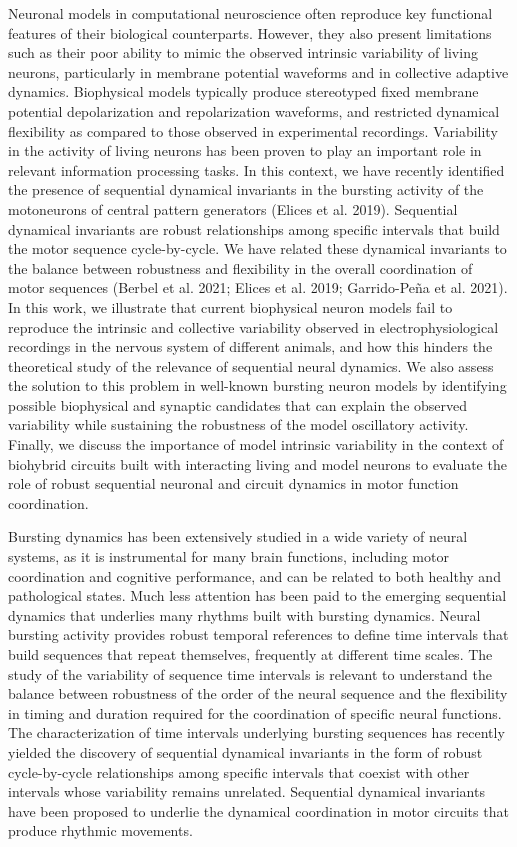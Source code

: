 Neuronal models in computational neuroscience often reproduce key functional features of their biological counterparts. However, they also present limitations such as their poor ability to mimic the observed intrinsic variability of living neurons, particularly in membrane potential waveforms and in collective adaptive dynamics. Biophysical models typically produce stereotyped fixed membrane potential depolarization and repolarization waveforms, and restricted dynamical flexibility as compared to those observed in experimental recordings. Variability in the activity of living neurons has been proven to play an important role in relevant information processing tasks. In this context, we have recently identified the presence of sequential dynamical invariants in the bursting activity of the motoneurons of central pattern generators (Elices et al. 2019). Sequential dynamical invariants are robust relationships among specific intervals that build the motor sequence cycle-by-cycle. We have related these dynamical invariants to the balance between robustness and flexibility in the overall coordination of motor sequences (Berbel et al. 2021; Elices et al. 2019; Garrido-Peña et al. 2021). In this work, we illustrate that current biophysical neuron models fail to reproduce the intrinsic and collective variability observed in electrophysiological recordings in the nervous system of different animals, and how this hinders the theoretical study of the relevance of sequential neural dynamics. We also assess the solution to this problem in well-known bursting neuron models by identifying possible biophysical and synaptic candidates that can explain the observed variability while sustaining the robustness of the model oscillatory activity. Finally, we discuss the importance of model intrinsic variability in the context of biohybrid circuits built with interacting living and model neurons to evaluate the role of robust sequential neuronal and circuit dynamics in motor function coordination.

Bursting dynamics has been extensively studied in a wide variety of neural systems, as it is instrumental for many brain functions, including motor coordination and cognitive performance, and can be related to both healthy and pathological states. Much less attention has been paid to the emerging sequential dynamics that underlies many rhythms built with bursting dynamics. Neural bursting activity provides robust temporal references to define time intervals that build sequences that repeat themselves, frequently at different time scales. The study of the variability of sequence time intervals is relevant to understand the balance between robustness of the order of the neural sequence and the flexibility in timing and duration required for the coordination of specific neural functions. The characterization of time intervals underlying bursting sequences has recently yielded the discovery of sequential dynamical invariants in the form of robust cycle-by-cycle relationships among specific intervals that coexist with other intervals whose variability remains unrelated. Sequential dynamical invariants have been proposed to underlie the dynamical coordination in motor circuits that produce rhythmic movements.  

